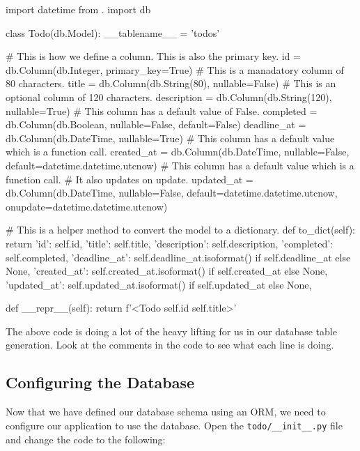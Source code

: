 \documentclass{csse4400}
\begin{document}
\begin{code}[language=python,numbers=none]{}
import datetime
from . import db

class Todo(db.Model):
    __tablename__ = 'todos'

    # This is how we define a column. This is also the primary key.
    id = db.Column(db.Integer, primary_key=True)
    # This is a manadatory column of 80 characters.
    title = db.Column(db.String(80), nullable=False)
    # This is an optional column of 120 characters.
    description = db.Column(db.String(120), nullable=True)
    # This column has a default value of False.
    completed = db.Column(db.Boolean, nullable=False, default=False)
    deadline_at = db.Column(db.DateTime, nullable=True)
    # This column has a default value which is a function call.
    created_at = db.Column(db.DateTime, nullable=False, default=datetime.datetime.utcnow)
    # This column has a default value which is a function call.
    # It also updates on update.
    updated_at = db.Column(db.DateTime, nullable=False,
                             default=datetime.datetime.utcnow,
                             onupdate=datetime.datetime.utcnow)
    
    # This is a helper method to convert the model to a dictionary.
    def to_dict(self):
        return {
            'id': self.id,
            'title': self.title,
            'description': self.description,
            'completed': self.completed,
            'deadline_at': self.deadline_at.isoformat() if self.deadline_at else None,
            'created_at': self.created_at.isoformat() if self.created_at else None,
            'updated_at': self.updated_at.isoformat() if self.updated_at else None,
        }

    def __repr__(self):
        return f'<Todo {self.id} {self.title}>'
\end{code}

The above code is doing a lot of the heavy lifting for us in our database table generation.
Look at the comments in the code to see what each line is doing.

\subsection{Configuring the Database}

Now that we have defined our database schema using an ORM,
we need to configure our application to use the database.
Open the \texttt{todo/\_\_init\_\_.py} file and change the code to the following:
\end{document}
